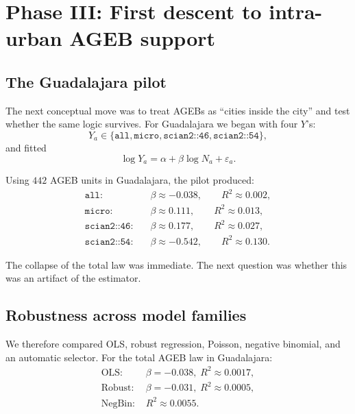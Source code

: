 \documentclass[11pt]{article}
\begin{document}
\section{Phase III: First descent to intra-urban AGEB support}

\subsection{The Guadalajara pilot}

The next conceptual move was to treat AGEBs as ``cities inside the city'' and test whether the same logic survives. For Guadalajara we began with four \(Y\)'s:
\begin{equation}
Y_a \in \{\texttt{all},\texttt{micro},\texttt{scian2::46},\texttt{scian2::54}\},
\end{equation}
and fitted
\begin{equation}
\log Y_a = \alpha + \beta \log N_a + \varepsilon_a.
\label{eq:ageb-pilot}
\end{equation}

Using \(442\) AGEB units in Guadalajara, the pilot produced:
\begin{align}
\texttt{all}: &\quad \beta \approx -0.038,\qquad R^2 \approx 0.002,\\
\texttt{micro}: &\quad \beta \approx 0.111,\qquad R^2 \approx 0.013,\\
\texttt{scian2::46}: &\quad \beta \approx 0.177,\qquad R^2 \approx 0.027,\\
\texttt{scian2::54}: &\quad \beta \approx -0.542,\qquad R^2 \approx 0.130.
\end{align}

The collapse of the total law was immediate. The next question was whether this was an artifact of the estimator.

\subsection{Robustness across model families}

We therefore compared OLS, robust regression, Poisson, negative binomial, and an automatic selector. For the total AGEB law in Guadalajara:
\begin{align}
\text{OLS: } & \beta=-0.038,\; R^2\approx 0.0017,\\
\text{Robust: } & \beta=-0.031,\; R^2\approx 0.0005,\\
\text{NegBin: } & R^2\approx 0.0055.
\end{align}
\end{document}
